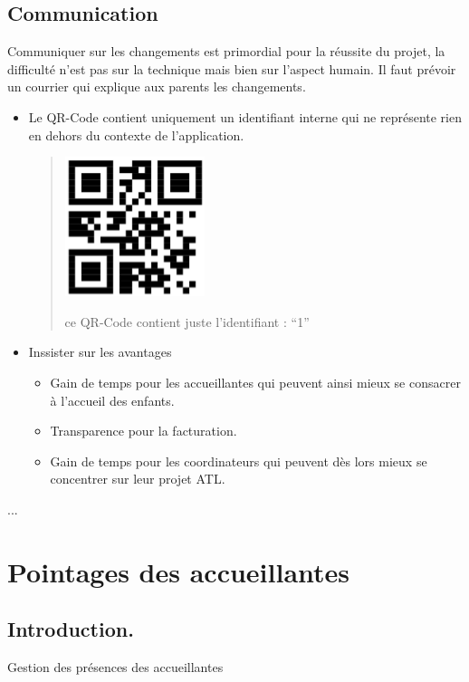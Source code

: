 \documentclass[letterpaper,10pt,english]{sphinxmanual}
\begin{document}
\section{Communication}
\label{checklist:communication}
Communiquer sur les changements est primordial pour la réussite du projet, la difficulté n'est pas sur la technique mais bien sur l'aspect humain.
Il faut prévoir un courrier qui explique aux parents les changements.
\begin{itemize}
\item {} 
Le QR-Code contient uniquement un identifiant interne qui ne représente rien en dehors du contexte de l'application.
\begin{quote}

\includegraphics{qrcode.png}

ce QR-Code contient juste l'identifiant : ``1''
\end{quote}

\item {} 
Inssister sur les avantages
\begin{itemize}
\item {} 
Gain de temps pour les accueillantes qui peuvent ainsi mieux se consacrer à l'accueil des enfants.

\item {} 
Transparence pour la facturation.

\item {} 
Gain de temps pour les coordinateurs qui peuvent dès lors mieux se concentrer sur leur projet ATL.

\end{itemize}

\end{itemize}

...


\chapter{Pointages des accueillantes}
\label{accueillantes::doc}\label{accueillantes:pointages-des-accueillantes}

\section{Introduction.}
\label{accueillantes:introduction}
Gestion des présences des accueillantes
\end{document}
